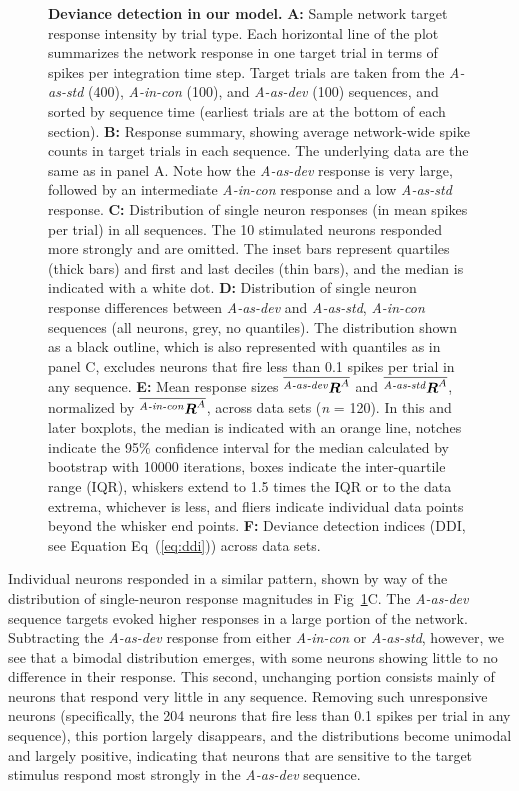 \documentclass[10pt,letterpaper]{article}
\newcommand{\dev}{\textit{A-as-dev}}
\newcommand{\msc}{\textit{A-in-con}}
\newcommand{\std}{\textit{A-as-std}}
\newcommand{\ifstringequal}[4]{%
  \ifnum\pdfstrcmp{#1}{#2}=0
  #3%
  \else
  #4%
  \fi
}
\newcommand{\seqreplace}[1]{\ifstringequal{dev}{#1}{\dev}{%
    \ifstringequal{std}{#1}{\std}{%
        \ifstringequal{msc}{#1}{\msc}{#1}%
    }%
}}
\newcommand{\R}[3][]{{}^{\seqreplace{#1}}_{}\boldsymbol R^{#2}_{#3}}
\newcommand{\mean}[1]{\overline{#1}}
\newcommand{\FIG}[1]{Fig~\ref{fig:#1}}
\newcommand{\EQ}[1]{Eq~(\ref{eq:#1})}
\newcommand{\statistic}[2]{\textit{#1} = \num{#2}}
\begin{document}
\begin{figure}[!h]
    \caption{%
        \textbf{Deviance detection in our model.}
        \textbf{A:} Sample network target response intensity by trial type. Each horizontal line of the plot summarizes the network response in one target trial in terms of spikes per integration time step. Target trials are taken from the \std{} (400), \msc{} (100), and \dev{} (100) sequences, and sorted by sequence time (earliest trials are at the bottom of each section).
        \textbf{B:} Response summary, showing average network-wide spike counts in target trials in each sequence. The underlying data are the same as in panel A. Note how the \dev{} response is very large, followed by an intermediate \msc{} response and a low \std{} response.
        \textbf{C:} Distribution of single neuron responses (in mean spikes per trial) in all sequences. The 10 stimulated neurons responded more strongly and are omitted. The inset bars represent quartiles (thick bars) and first and last deciles (thin bars), and the median is indicated with a white dot.
        \textbf{D:} Distribution of single neuron response differences between \dev{} and \std{}, \msc{} sequences (all neurons, grey, no quantiles). The distribution shown as a black outline, which is also represented with quantiles as in panel C, excludes neurons that fire less than 0.1 spikes per trial in any sequence.
        \textbf{E:} Mean response sizes $\mean{\R[dev]{A}{}}$ and $\mean{\R[std]{A}{}}$, normalized by $\mean{\R[msc]{A}{}}$, across data sets (\statistic{n}{120}). In this and later boxplots, the median is indicated with an orange line, notches indicate the 95\% confidence interval for the median calculated by bootstrap with 10000 iterations, boxes indicate the inter-quartile range (IQR), whiskers extend to 1.5 times the IQR or to the data extrema, whichever is less, and fliers indicate individual data points beyond the whisker end points.
        \textbf{F:} Deviance detection indices (DDI, see Equation \EQ{ddi}) across data sets.
    }
    \label{fig:2}
\end{figure}

Individual neurons responded in a similar pattern, shown by way of the distribution of single-neuron response magnitudes in \FIG{2}C. The \dev{} sequence targets evoked higher responses in a large portion of the network. Subtracting the \dev{} response from either \msc{} or \std{}, however, we see that a bimodal distribution emerges, with some neurons showing little to no difference in their response. This second, unchanging portion consists mainly of neurons that respond very little in any sequence. Removing such unresponsive neurons (specifically, the 204 neurons that fire less than 0.1 spikes per trial in any sequence), this portion largely disappears, and the distributions become unimodal and largely positive, indicating that neurons that are sensitive to the target stimulus respond most strongly in the \dev{} sequence.
\end{document}
